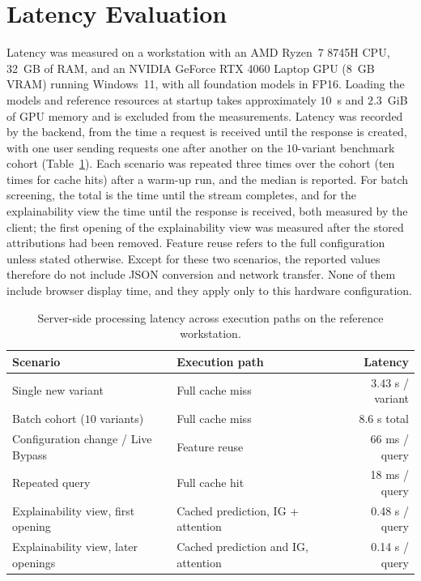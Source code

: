 \section{Latency Evaluation}
\label{sec:latency}

Latency was measured on a workstation with an AMD Ryzen~7 8745H CPU, 32~GB of RAM, and an NVIDIA GeForce RTX 4060 Laptop GPU (8~GB VRAM) running Windows~11, with all foundation models in FP16. Loading the models and reference resources at startup takes approximately $10$~s and $2.3$~GiB of GPU memory and is excluded from the measurements. Latency was recorded by the backend, from the time a request is received until the response is created, with one user sending requests one after another on the $10$-variant benchmark cohort (Table~\ref{tab:latency_benchmarks}). Each scenario was repeated three times over the cohort (ten times for cache hits) after a warm-up run, and the median is reported. For batch screening, the total is the time until the stream completes, and for the explainability view the time until the response is received, both measured by the client; the first opening of the explainability view was measured after the stored attributions had been removed. Feature reuse refers to the full configuration unless stated otherwise. Except for these two scenarios, the reported values therefore do not include JSON conversion and network transfer. None of them include browser display time, and they apply only to this hardware configuration.

\begin{table}[htbp]
    \centering
    \caption{Server-side processing latency across execution paths on the reference workstation.}
    \label{tab:latency_benchmarks}
    \begin{tabular}{p{}p{}r}
        \toprule
        \textbf{Scenario} & \textbf{Execution path} & \textbf{Latency} \\
        \midrule
        Single new variant & Full cache miss & 3.43 s / variant \\
        Batch cohort ($10$ variants) & Full cache miss & 8.6 s total \\
        Configuration change / Live Bypass & Feature reuse & 66 ms / query \\
        Repeated query & Full cache hit & 18 ms / query \\
        Explainability view, first opening & Cached prediction, IG + attention & 0.48 s / query \\
        Explainability view, later openings & Cached prediction and IG, attention & 0.14 s / query \\
        \bottomrule
    \end{tabular}
\end{table}


